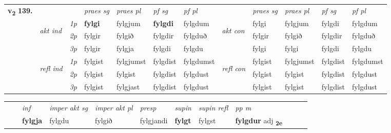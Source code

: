 \begin{tabular}{llllllllllll} \toprule
\multirow{4}{*}{{{\textbf{v{\textsubscript{2}}} \Large{\textbf{139.}}}}}  & &   &  \textit{praes sg}  & \textit{praes pl}  &\textit{ pf sg} & \textit{pf pl} &  &  \textit{praes sg}  & \textit{praes pl}  & \textit{pf sg} & \textit{pf pl } \\*
	\cmidrule{4-7} \cmidrule{9-12}
 & \multirow{3}{*}{\begin{turn}{90}\textit{akt ind}\end{turn}} & {\textit{1p}} & \textbf{fylgi} & fylgjum    & \textbf{fylgdi} & fylgdum & \multirow{3}{*}{\begin{turn}{90}\textit{akt con}\end{turn}} &fylgi & fylgjum & fylgdi & fylgdum\\*
& &  {\textit{2p}} &  fylgir  & fylgið   & fylgdir & fylgduð & & fylgir & fylgið & fylgdir & fylgduð \\*
& &  {\textit{3p}} & fylgir & fylgja   & fylgdi & fylgdu & & fylgi & fylgi& fylgdi & fylgdu  \\*
\cmidrule{4-7} \cmidrule{9-12}
 &\multirow{3}{*}{\begin{turn}{90}\textit{refl ind}\end{turn}} & {\textit{1p}} & fylgist & fylgjumst    & fylgdist & fylgdumst & \multirow{3}{*}{\begin{turn}{90}\textit{refl con}\end{turn}}  &fylgist & fylgjumst & fylgdist & fylgdumst\\*
 &&  {\textit{2p}} &  fylgist  & fylgist   & fylgdist & fylgdust & &fylgist & fylgist & fylgdist & fylgdust \\*
& &  {\textit{3p}} & fylgist & fylgjast   & fylgdist & fylgdust & & fylgist & fylgist& fylgdist & fylgdust  \\*
\cmidrule{4-7} \cmidrule{9-12}
\end{tabular}


\begin{tabular}{llllllllllll}
 & & \textit{inf} & \textit{imper akt sg} & \textit{imper akt pl}   & \textit{presp} & \textit{supin} & \textit{supin refl} & \textit{pp m}     \\*
  & & \textbf{fylgja} & fylgdu  & fylgið   & fylgjandi &  \textbf{fylgt} & fylgst & \textbf{fylgdur} adj \textbf{\textsubscript{2e}} \\*
\cmidrule{1-12}
\end{tabular}



